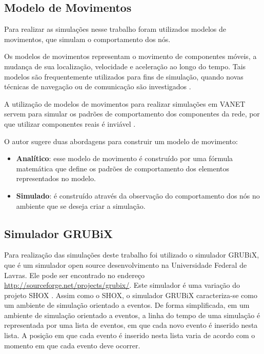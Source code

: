 \subsection{Modelo de Movimentos}

Para realizar as simulações nesse trabalho foram utilizados modelos de movimentos, que simulam o comportamento dos nós.

Os modelos de movimentos representam o movimento de componentes móveis, a mudança de sua localização, velocidade e aceleração ao longo do tempo. Tais modelos são frequentemente utilizados para fins de simulação, quando novas técnicas de navegação ou de comunicação são investigados \cite{Nichols:2007}. 

A utilização de modelos de movimentos para realizar simulações em VANET servem para simular os padrões de comportamento dos componentes da rede, por que utilizar componentes reais é inviável \cite{Freitas:2011}.

O autor \cite{Sun:2002} sugere duas abordagens para construir um modelo de movimento:

\begin{itemize}
\item \textbf{Analítico}: esse modelo de movimento é construído por uma fórmula matemática que define os padrões de comportamento dos elementos representados no modelo. 

\item \textbf{Simulado}: é construído através da observação do comportamento dos nós no ambiente que se deseja criar a simulação.

\end{itemize}

\subsection{Simulador GRUBiX}

Para realização das simulações deste trabalho foi utilizado o simulador GRUBiX, que é um simulador open source desenvolvimento na Universidade Federal de Lavras. Ele pode ser encontrado no endereço \url{http://sourceforge.net/projects/grubix/}. Este simulador é uma variação do projeto SHOX \cite{Lessmann:2008}. Assim como o SHOX, o simulador GRUBiX caracteriza-se como um ambiente de simulação orientado a eventos. De forma simplificada, em um ambiente de simulação orientado a eventos, a linha do tempo de uma simulação é representada por uma lista de eventos, em que cada novo evento é inserido nesta lista. A posição em que cada evento é inserido nesta lista varia de acordo com o momento em que cada evento deve ocorrer.

